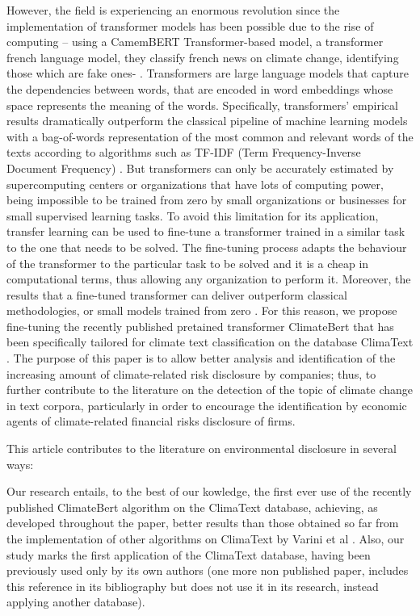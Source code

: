 \documentclass[runningheads]{llncs}
\begin{document}
However, the field is experiencing an enormous revolution since the implementation of transformer models has been possible due to the rise of computing \cite{meddeb2022counteracting} – using a CamemBERT Transformer-based model, a transformer french language model, they  classify french news on climate change, identifying those which are fake ones- \cite{kolbel2022ask,bingler2022cheap,webersinke2021climatebert,friederich2021automated,luccioni2020analyzing}.  Transformers are large language models that capture the dependencies between words, that are encoded in word embeddings whose space represents the meaning of the words. Specifically, transformers’ empirical results dramatically outperform the classical pipeline of machine learning models with a bag-of-words representation of the most common and relevant words of the texts according to algorithms such as TF-IDF (Term Frequency-Inverse Document Frequency) \cite{gonzalez2020comparing}. But transformers can only be accurately estimated by supercomputing centers or organizations that have lots of computing power, being impossible to be trained from zero by small organizations or businesses for small supervised learning tasks. To avoid this limitation for its application, transfer learning can be used to fine-tune a transformer trained in a similar task to the one that needs to be solved. The fine-tuning process adapts the behaviour of the transformer to the particular task to be solved and it is a cheap in computational terms, thus allowing any organization to perform it. Moreover, the results that a fine-tuned transformer can deliver outperform classical methodologies, or small models trained from zero \cite{gonzalez2020comparing,kolbel2022ask,friederich2021automated}. For this reason, we propose fine-tuning the recently published pretained transformer ClimateBert that has been specifically tailored for climate text classification \cite{webersinke2021climatebert} on the database ClimaText \cite{varini2020climatext}. The purpose of this paper is to allow better analysis and identification of the increasing amount of climate-related risk disclosure by companies; thus, to further contribute to the literature on the detection of the topic of climate change in text corpora, particularly in order to encourage the identification by economic agents of climate-related financial risks disclosure of firms. 

This article contributes to the literature on environmental disclosure in several ways: 

Our research entails, to the best of our kowledge, the first ever use of the recently published ClimateBert algorithm on the ClimaText database, achieving, as developed throughout the paper, better results than those obtained so far from the implementation of other algorithms on ClimaText by Varini et al \cite{varini2020climatext}. Also, our study marks the first application of the ClimaText database, having been previously used only by its own authors \cite{varini2020climatext} (one more non published paper, includes this reference in its bibliography but does not use it in its research, instead applying another database). 
\end{document}
